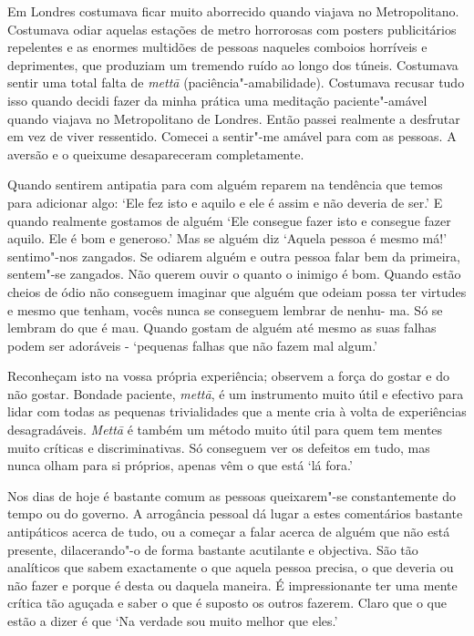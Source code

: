 Em Londres costumava ficar muito aborrecido quando viajava no
Metropolitano. Costumava odiar aquelas estações de metro horrorosas com
posters publicitários repelentes e as enormes multidões de pessoas
naqueles comboios horríveis e deprimentes, que produziam um tremendo
ruído ao longo dos túneis. Costumava sentir uma total falta de
\emph{mettā} (paciência"-amabilidade). Costumava recusar tudo isso quando
decidi fazer da minha prática uma meditação paciente"-amável quando
viajava no Metropolitano de Londres. Então passei realmente a desfrutar
em vez de viver ressentido. Comecei a sentir"-me amável para com as
pessoas. A aversão e o queixume desapareceram completamente.

Quando sentirem antipatia para com alguém reparem na tendência que temos
para adicionar algo: `Ele fez isto e aquilo e ele é assim e não deveria
de ser.' E quando realmente gostamos de alguém `Ele consegue fazer isto
e consegue fazer aquilo. Ele é bom e generoso.' Mas se alguém diz
`Aquela pessoa é mesmo má!' sentimo"-nos zangados. Se odiarem alguém e
outra pessoa falar bem da primeira, sentem"-se zangados. Não querem ouvir
o quanto o inimigo é bom. Quando estão cheios de ódio não conseguem
imaginar que alguém que odeiam possa ter virtudes e mesmo que tenham,
vocês nunca se conseguem lembrar de nenhu- ma. Só se lembram do que é
mau. Quando gostam de alguém até mesmo as suas falhas podem ser
adoráveis - `pequenas falhas que não fazem mal algum.'

Reconheçam isto na vossa própria experiência; observem a força do gostar
e do não gostar. Bondade paciente, \emph{mettā}, é um instrumento muito
útil e efectivo para lidar com todas as pequenas trivialidades que a
mente cria à volta de experiências
desagradáveis. \emph{Mettā} é também um método muito útil para quem tem
mentes muito críticas e discriminativas. Só conseguem ver os defeitos em
tudo, mas nunca olham para si próprios, apenas vêm o que está `lá fora.'

Nos dias de hoje é bastante comum as pessoas queixarem"-se constantemente
do tempo ou do governo. A arrogância pessoal dá lugar a estes
comentários bastante antipáticos acerca de tudo, ou a começar a falar
acerca de alguém que não está presente, dilacerando"-o de forma bastante
acutilante e objectiva. São tão analíticos que sabem exactamente o que
aquela pessoa precisa, o que deveria ou não fazer e porque é desta ou
daquela maneira. É impressionante ter uma mente crítica tão aguçada e
saber o que é suposto os outros fazerem. Claro que o que estão a dizer é
que `Na verdade sou muito melhor que eles.'


